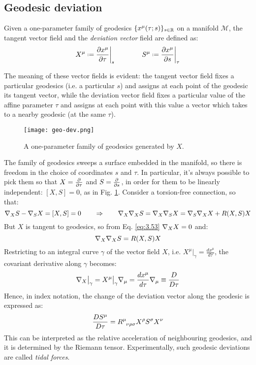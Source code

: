 \subsection{Geodesic deviation}

\begin{definition}
  Given a one-parameter family of geodesics $ \{x^\mu(\tau;s)\}_{s \in \mathbb{R}} $ on a manifold $ \mathcal{M} $, the tangent vector field and the \textit{deviation vector} field are defined as:
  \begin{equation}
    X^\mu \defeq \frac{\pa x^\mu}{\pa \tau}\bigg\vert_s
    \qquad \qquad
    S^\mu \defeq \frac{\pa x^\mu}{\pa s}\bigg\vert_\tau
    \label{eq:3.56}
  \end{equation}
\end{definition}
The meaning of these vector fields is evident: the tangent vector field fixes a particular geodesics (i.e. a particular $ s $) and assigns at each point of the geodesic its tangent vector, while the deviation vector field fixes a particular value of the affine parameter $ \tau $ and assigns at each point with this value a vector which takes to a nearby geodesic (at the same $ \tau $).

\begin{figure}
  \centering
  \texttt{[image: geo-dev.png]}
  \caption{A one-parameter family of geodesics generated by $ X $.}
  \label{geo-dev}
\end{figure}

The family of geodesics sweeps a surface embedded in the manifold, so there is freedom in the choice of coordinates $ s $ and $ \tau $. In particular, it's always possible to pick them so that $ X = \frac{\partial}{\partial \tau} $ and $ S = \frac{\partial}{\partial s} $, in order for them to be linearly independent: $ [X,S] = 0 $, as in Fig. \ref{geo-dev}. Consider a torsion-free connection, so that:
\begin{equation*}
  \nabla_X S - \nabla_S X = [X,S] = 0
  \qquad \Rightarrow \qquad
  \nabla_X \nabla_X S = \nabla_X \nabla_S X = \nabla_S \nabla_X X + R(X,S) X
\end{equation*}
But $ X $ is tangent to geodesics, so from Eq. \ref{eq:3.53} $ \nabla_X X = 0 $ and:
\begin{equation}
  \nabla_X \nabla_X S = R(X,S) X
  \label{eq:3.57}
\end{equation}
Restricting to an integral curve $ \gamma $ of the vector field $ X $, i.e. $ X^\mu \vert_\gamma = \frac{dx^\mu}{d\tau} $, the covariant derivative along $ \gamma $ becomes:
\begin{equation*}
  \nabla_X\big\vert_\gamma = X^\mu\big\vert_\gamma \nabla_\mu = \frac{dx^\mu}{d\tau} \nabla_\mu \equiv \frac{D}{D\tau}
\end{equation*}
Hence, in index notation, the change of the deviation vector along the geodesic is expressed as:
\begin{equation}
  \frac{DS^\mu}{D\tau} = \tensor{R}{^\mu _{\nu \rho \sigma}} X^\rho S^\sigma X^\nu
  \label{eq:3.58}
\end{equation}
This can be interpreted as the relative acceleration of neighbouring geodesics, and it is determined by the Riemann tensor. Experimentally, such geodesic deviations are called \textit{tidal forces}.

